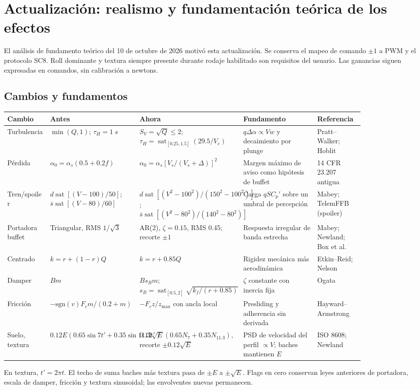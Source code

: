 \documentclass[11pt,a4paper]{article}
\newcommand{\sat}{\operatorname{sat}}
\begin{document}
\section{Actualización: realismo y fundamentación teórica de los efectos}\label{sec:realismo}
El análisis de fundamento teórico del 10 de octubre de 2026 motivó esta actualización. Se conserva el mapeo de comando $\pm1$ a PWM y el protocolo SC8. Roll dominante y textura siempre presente durante rodaje habilitado son requisitos del usuario. Las ganancias siguen expresadas en comandos, sin calibración a newtons.



\subsection{Cambios y fundamentos}
\begingroup\small
\begin{longtable}{p{0.11\linewidth}p{0.19\linewidth}p{0.24\linewidth}p{0.19\linewidth}p{0.12\linewidth}}
\toprule Cambio&Antes&Ahora&Fundamento&Referencia\\\midrule\endhead
Turbulencia&$\min(Q,1)$; $\tau_H=1$ s&$S_V=\sqrt Q\le2$; $\tau_H=\sat_{[0.25,1.5]}(29.5/V_e)$&$q\Delta\alpha\propto Vw$ y decaimiento por plunge&Pratt--Walker; Hoblit\\
Pérdida&$\alpha_0=\alpha_s(0.5+0.2f)$&$\alpha_0=\alpha_s[V_s/(V_s+\Delta)]^2$&Margen máximo de aviso como hipótesis de buffet&14 CFR 23.207 antigua\\
Tren/spoiler&$d\sat[(V-100)/50]$; $\bar s\sat[(V-80)/60]$&$d\sat[(V^2-100^2)/(150^2-100^2)]$; $\bar s\sat[(V^2-80^2)/(140^2-80^2)]$&Carga $qSC_p'$ sobre un umbral de percepción&Mabey; TelemFFB (spoiler)\\
Portadora buffet&Triangular, RMS $1/\sqrt3$&AR(2), $\zeta=0.15$, RMS 0.45; recorte $\pm1$&Respuesta irregular de banda estrecha&Mabey; Newland; Box et al.\\
Centrado&$k=r+(1-r)Q$&$k=r+0.85Q$&Rigidez mecánica más aerodinámica&Etkin--Reid; Nelson\\
Damper&$Bm$&$Bs_Bm$; $s_B=\sat_{[0.5,2]}\sqrt{k_f/(r+0.85)}$&$\zeta$ constante con inercia fija&Ogata\\
Fricción&$-\mathrm{sgn}(v)F_cm/(0.2+m)$&$-F_cz/z_{\max}$ con ancla local&Presliding y adherencia sin derivada&Hayward--Armstrong\\
Suelo, textura&$0.12E(0.65\sin7t'+0.35\sin11.3t')$&$0.12\sqrt E(0.65N_7+0.35N_{11.3})$, recorte $\pm0.12\sqrt E$&PSD de velocidad del perfil $\propto V$; baches mantienen $E$&ISO 8608; Newland\\
\bottomrule\end{longtable}
\endgroup
En textura, $t'=2\pi t$. El techo de suma baches más textura pasa de $\pm E$ a $\pm\sqrt E$. Flags en cero conservan leyes anteriores de portadora, escala de damper, fricción y textura sinusoidal; las envolventes nuevas permanecen.
\end{document}
